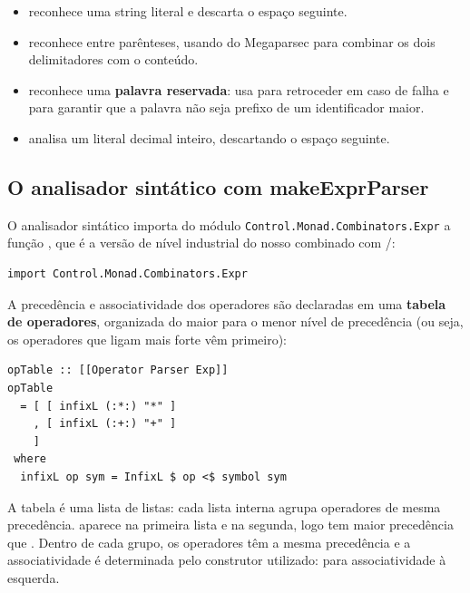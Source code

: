 \begin{itemize}
  \item {} reconhece uma string literal e
    descarta o espaço seguinte.
  \item {} reconhece
     entre parênteses, usando
     do Megaparsec para combinar os
    dois delimitadores com o conteúdo.
  \item {} reconhece uma \textbf{palavra
    reservada}: usa  para retroceder em
    caso de falha e 
    para garantir que a palavra não seja prefixo de um
    identificador maior.
  \item {} analisa um literal decimal inteiro,
    descartando o espaço seguinte.
\end{itemize}

\subsection{O analisador sintático com makeExprParser}

O analisador sintático importa do módulo
\verb|Control.Monad.Combinators.Expr| a função
, que é a versão de nível
industrial do nosso  combinado com
/:

\begin{verbatim}
import Control.Monad.Combinators.Expr
\end{verbatim}

A precedência e associatividade dos operadores são declaradas em uma
\textbf{tabela de operadores}, organizada do maior para o menor nível
de precedência (ou seja, os operadores que ligam mais forte vêm primeiro):

\begin{verbatim}
opTable :: [[Operator Parser Exp]]
opTable
  = [ [ infixL (:*:) "*" ]
    , [ infixL (:+:) "+" ]
    ]
 where
  infixL op sym = InfixL $ op <$ symbol sym
\end{verbatim}

A tabela é uma lista de listas: cada lista interna agrupa operadores
de mesma precedência. \haskell{(:*:)} aparece na
primeira lista e \haskell{(:+:)} na segunda, logo
\haskell{*} tem maior precedência que
\haskell{+}. Dentro de cada grupo, os operadores têm
a mesma precedência e a associatividade é determinada pelo construtor
utilizado:  para associatividade à esquerda.

